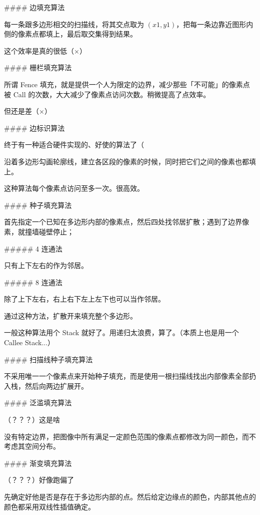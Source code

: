 \documentclass[
]{article}
\newenvironment{Shaded}{}{}
\newcommand{\FunctionTok}[1]{\textcolor[rgb]{0.02,0.16,0.49}{#1}}
\newcommand{\NormalTok}[1]{#1}
\begin{document}
\begin{Shaded}
\begin{Highlighting}[]
\FunctionTok{#### 边填充算法}

\NormalTok{每一条跟多边形相交的扫描线，将其交点取为 $(x1, y1)$，把每一条边靠近图形内侧的像素点都填上，最后取交集得到结果。}

\NormalTok{这个效率是真的很低（×）}

\FunctionTok{#### 栅栏填充算法}

\NormalTok{所谓 Fence 填充，就是提供一个人为限定的边界，减少那些「不可能」的像素点被 Call 的次数，大大减少了像素点访问次数。稍微提高了点效率。}

\NormalTok{但还是差（×）}

\FunctionTok{#### 边标识算法}

\NormalTok{终于有一种适合硬件实现的、好使的算法了（}

\NormalTok{沿着多边形勾画轮廓线，建立各区段的像素的时候，同时把它们之间的像素也都填上。}

\NormalTok{这种算法每个像素点访问至多一次。很高效。}

\FunctionTok{#### 种子填充算法}

\NormalTok{首先指定一个已知在多边形内部的像素点，然后四处找邻居扩散；遇到了边界像素，就撞墙碰壁停止；}

\FunctionTok{##### 4 连通法}

\NormalTok{只有上下左右的作为邻居。}

\FunctionTok{##### 8 连通法}

\NormalTok{除了上下左右，右上右下左上左下也可以当作邻居。}

\NormalTok{通过这种方法，扩散开来填充整个多边形。}

\NormalTok{一般这种算法用个 Stack 就好了。用递归太浪费，算了。（本质上也是用一个 Callee Stack...）}

\FunctionTok{#### 扫描线种子填充算法}

\NormalTok{不采用唯一一个像素点来开始种子填充，而是使用一根扫描线找出内部像素全部扔入栈，然后向两边扩展开。}

\FunctionTok{#### 泛滥填充算法}

\NormalTok{（？？？）这是啥}

\NormalTok{没有特定边界，把图像中所有满足一定颜色范围的像素点都修改为同一颜色，而不考虑其空间分布。}

\FunctionTok{#### 渐变填充算法}

\NormalTok{（？？？）好像跑偏了}

\NormalTok{先确定好他是否是存在于多边形内部的点。然后给定边缘点的颜色，内部其他点的颜色都采用双线性插值确定。}


\end{Highlighting}
\end{Shaded}
\end{document}
